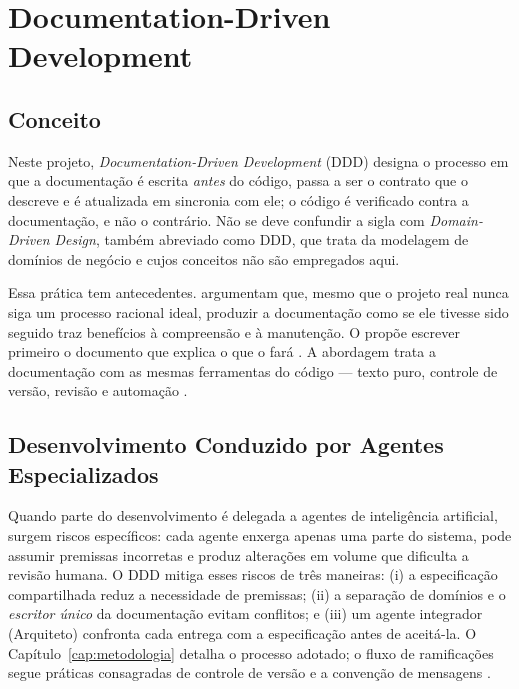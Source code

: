 \section{Documentation-Driven Development}\label{sec:fund-ddd}

\subsection{Conceito}

Neste projeto, \emph{Documentation-Driven Development} (DDD) designa o processo em que a documentação é escrita \emph{antes} do código, passa a ser o contrato que o descreve e é atualizada em sincronia com ele; o código é verificado contra a documentação, e não o contrário. Não se deve confundir a sigla com \emph{Domain-Driven Design}, também abreviado como DDD, que trata da modelagem de domínios de negócio \cite{evans2003ddd} e cujos conceitos não são empregados aqui.

Essa prática tem antecedentes.  argumentam que, mesmo que o projeto real nunca siga um processo racional ideal, produzir a documentação como se ele tivesse sido seguido traz benefícios à compreensão e à manutenção. O  propõe escrever primeiro o documento que explica o que o  fará \cite{rdd}. A abordagem  trata a documentação com as mesmas ferramentas do código --- texto puro, controle de versão, revisão e automação \cite{writethedocs,gentle2017docs}.

\subsection{Desenvolvimento Conduzido por Agentes Especializados}

Quando parte do desenvolvimento é delegada a agentes de inteligência artificial, surgem riscos específicos: cada agente enxerga apenas uma parte do sistema, pode assumir premissas incorretas e produz alterações em volume que dificulta a revisão humana. O DDD mitiga esses riscos de três maneiras: (i) a especificação compartilhada reduz a necessidade de premissas; (ii) a separação de domínios e o \emph{escritor único} da documentação evitam conflitos; e (iii) um agente integrador (Arquiteto) confronta cada entrega com a especificação antes de aceitá-la. O Capítulo~\ref{cap:metodologia} detalha o processo adotado; o fluxo de ramificações segue práticas consagradas de controle de versão \cite{chacon2014progit} e a convenção de mensagens  \cite{conventionalcommits}.


